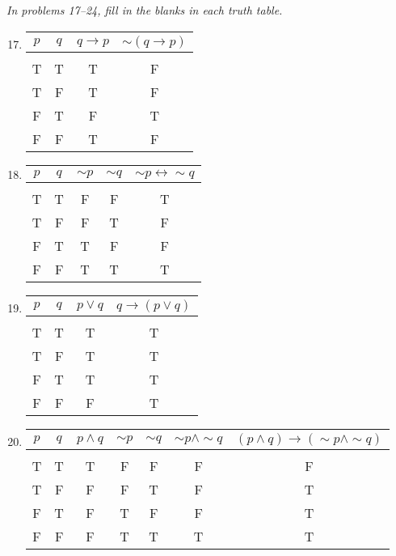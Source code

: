 \emph{In problems 17--24, fill in the blanks in each truth table.}
\begin{enumerate}
\setcounter{enumi}{16}

\item 
\begin{center}
\begin{tabular}{|c | c | c | c|}
\hline
$p$ & $q$ & $q \to p$ & $\sim (q \to p)$\\
\hline
& & &\\
T & T & T & F\\
T & F & T & F\\
F & T & F & T\\
F & F & T & F\\
\hline
\end{tabular}
\end{center}

\item 
\begin{center}
\begin{tabular}{|c | c | c | c | c|}
\hline
$p$ & $q$ & $\sim p$ & $\sim q$ & $\sim p \leftrightarrow \sim q$\\
\hline
& & & &\\
T & T & F & F & T\\
T & F & F & T & F\\
F & T & T & F & F\\
F & F & T & T & T\\
\hline
\end{tabular}
\end{center}

\item 
\begin{center}
\begin{tabular}{|c | c | c | c|}
\hline
$p$ & $q$ & $p \vee q$ & $q \to (p \vee q)$\\
\hline
& & &\\
T & T & T & T\\
T & F & T & T\\
F & T & T & T\\
F & F & F & T\\
\hline
\end{tabular}
\end{center}

\item 
\begin{center}
\begin{tabular}{|c | c | c | c | c | c | c|}
\hline
$p$ & $q$ & $p \wedge q$ & $\sim p$ & $\sim q$ & $\sim p \wedge \sim q$ & $(p \wedge q) \to (\sim p \wedge \sim q)$\\
\hline
& & & & & &\\
T & T & T & F & F & F & F\\
T & F & F & F & T & F & T\\
F & T & F & T & F & F & T\\
F & F & F & T & T & T & T\\
\hline
\end{tabular}
\end{center}


\end{enumerate}
